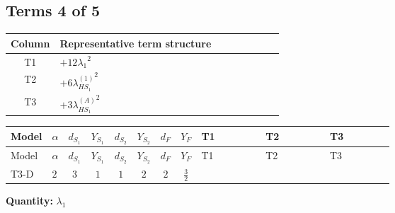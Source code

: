 \documentclass[8pt]{article}
\begin{document}
\begin{landscape}
\subsection*{Terms 4 of 5}
\begin{center}
\begin{tabular}{@{}c >{\raggedright\arraybackslash}p{0.82\linewidth}@{}}
\toprule
Column & Representative term structure \\
\midrule
T1 & \(\displaystyle +12 {\lambda_1}^2\) \\
\midrule
T2 & \(\displaystyle +6 {\lambda_{HS_1}^{(1)}}^2\) \\
\midrule
T3 & \(\displaystyle +3 {\lambda_{HS_1}^{(A)}}^2\) \\
\midrule
\bottomrule
\end{tabular}
\end{center}
\smallskip
\tiny
\begin{longtable}{@{}llcccccc >{\raggedright\arraybackslash}p{0.21\linewidth} >{\raggedright\arraybackslash}p{0.21\linewidth} >{\raggedright\arraybackslash}p{0.21\linewidth}@{}}
\toprule
Model & $\alpha$ & $d_{S_1}$ & $Y_{S_1}$ & $d_{S_2}$ & $Y_{S_2}$ & $d_F$ & $Y_F$ & T1 & T2 & T3 \\
\midrule
\endfirsthead
\toprule
Model & $\alpha$ & $d_{S_1}$ & $Y_{S_1}$ & $d_{S_2}$ & $Y_{S_2}$ & $d_F$ & $Y_F$ & T1 & T2 & T3 \\
\midrule
\endhead
T3-D & $2$ & $3$ & $1$ & $1$ & $2$ & $2$ & $\frac{3}{2}$ & \scriptsize\adjustbox{max width=\linewidth}{$\begin{gathered} +12 {\lambda_1}^2\end{gathered}$} & \scriptsize\adjustbox{max width=\linewidth}{$\begin{gathered} +6 {\lambda_{HS_1}^{(1)}}^2\end{gathered}$} & \scriptsize\adjustbox{max width=\linewidth}{$\begin{gathered} +3 {\lambda_{HS_1}^{(A)}}^2\end{gathered}$} \\
\midrule
\bottomrule
\end{longtable}
\clearpage
\noindent\textbf{Quantity: }$\lambda_1$\par\smallskip

\end{landscape}
\end{document}
